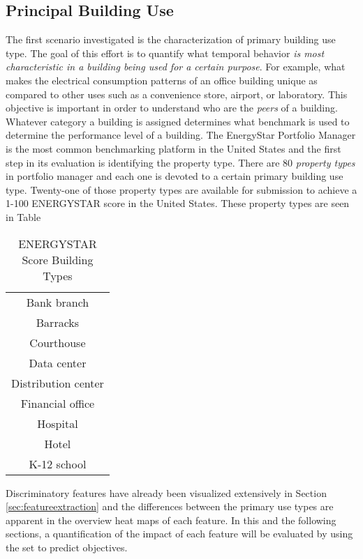 \subsection{Principal Building Use}
\label{sec:buildinguse}

The first scenario investigated is the characterization of primary building use type. The goal of this effort is to quantify what temporal behavior \emph{is most characteristic in a building being used for a certain purpose}. For example, what makes the electrical consumption patterns of an office building unique as compared to other uses such as a convenience store, airport, or laboratory. This objective is important in order to understand who are the \emph{peers} of a building. Whatever category a building is assigned determines what benchmark is used to determine the performance level of a building. The EnergyStar Portfolio Manager is the most common benchmarking platform in the United States and the first step in its evaluation is identifying the property type. There are 80 \emph{property types} in portfolio manager and each one is devoted to a certain primary building use type. Twenty-one of those property types are available for submission to achieve a 1-100 ENERGYSTAR score in the United States. These property types are seen in Table

\begin{table} 
    \begin{tabular}{ c }
         Bank branch  \\ 
         Barracks  \\ 
         Courthouse  \\ 
         Data center  \\ 
         Distribution center  \\ 
         Financial office  \\ 
         Hospital  \\ 
         Hotel \\ 
         K-12 school  \\ 
    \end{tabular} 
    \caption{ENERGYSTAR Score Building Types} 
\end{table}



Discriminatory features have already been visualized extensively in Section \ref{sec:featureextraction} and the differences between the primary use types are apparent in the overview heat maps of each feature. In this and the following sections, a quantification of the impact of each feature will be evaluated by using the set to predict objectives.